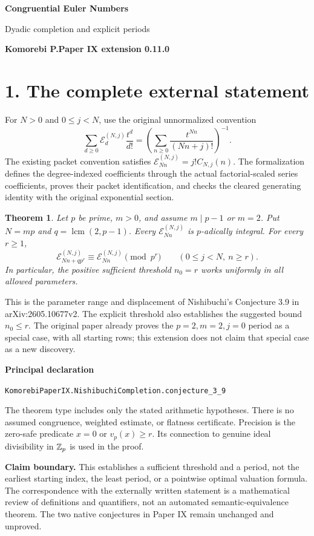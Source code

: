 \documentclass[11pt]{article}
\newcommand{\EE}{\mathcal E}\newcommand{\PP}{\mathcal P}
\newcommand{\code}[1]{\texttt{\small #1}}
\newtheorem*{theorem}{Theorem}
\begin{document}
\thispagestyle{fancy}
{\Large\bfseries\color{ink}Congruential Euler Numbers}\par
{\large Dyadic completion and explicit periods}\par
\textbf{Komorebi P.}\hfill\textbf{Paper IX extension 0.11.0}

\section*{1. The complete external statement}
For $N>0$ and $0\le j<N$, use the original unnormalized convention
\[
 \sum_{d\ge0}\EE_d^{(N,j)}\frac{t^d}{d!}
 =\left(\sum_{n\ge0}\frac{t^{Nn}}{(Nn+j)!}\right)^{-1}.
\]
The existing packet convention satisfies
$\EE_{Nn}^{(N,j)}=j!C_{N,j}(n)$. The formalization defines the degree-indexed coefficients through the actual factorial-scaled series coefficients, proves their packet identification, and checks the cleared generating identity with the original exponential section.

\begin{theorem}
Let $p$ be prime, $m>0$, and assume $m\mid p-1$ or $m=2$. Put $N=mp$ and $q=\operatorname{lcm}(2,p-1)$. Every $\EE_{Nn}^{(N,j)}$ is $p$-adically integral. For every $r\ge1$,
\[
\boxed{\EE_{Nn+qp^r}^{(N,j)}\equiv\EE_{Nn}^{(N,j)}\pmod{p^r}
       \qquad(0\le j<N,\ n\ge r).}
\]
In particular, the positive sufficient threshold $n_0=r$ works uniformly in all allowed parameters.
\end{theorem}

This is the parameter range and displacement of Nishibuchi's Conjecture 3.9 in arXiv:2605.10677v2. The explicit threshold also establishes the suggested bound $n_0\le r$. The original paper already proves the $p=2,m=2,j=0$ period as a special case, with all starting rows; this extension does not claim that special case as a new discovery.

\textbf{Principal declaration}\par
\code{KomorebiPaperIX.NishibuchiCompletion.conjecture\_3\_9}

The theorem type includes only the stated arithmetic hypotheses. There is no assumed congruence, weighted estimate, or flatness certificate. Precision is the zero-safe predicate $x=0$ or $v_p(x)\ge r$. Its connection to genuine ideal divisibility in $\mathbb Z_p$ is used in the proof.

\textbf{Claim boundary.} This establishes a sufficient threshold and a period, not the earliest starting index, the least period, or a pointwise optimal valuation formula. The correspondence with the externally written statement is a mathematical review of definitions and quantifiers, not an automated semantic-equivalence theorem. The two native conjectures in Paper IX remain unchanged and unproved.
\end{document}
